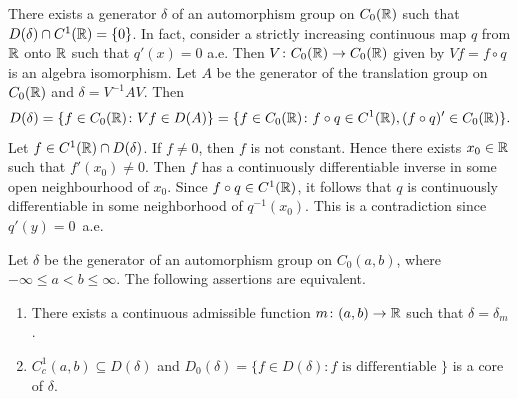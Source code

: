 \begin{example}\label{ex:b2-3.22}
%
There exists a generator $\delta$ of an automorphism group on $C_{0}(\mathbb{R})$ such that $D(\delta) \cap C^{1}(\mathbb{R}) = \{0\}$.
In fact, consider a strictly increasing continuous map $q$ from $\mathbb{R}$ onto $\mathbb{R}$ such that
$q'(x) = 0$ a.e.
Then $V \colon C_{0}(\mathbb{R}) \to C_{0}(\mathbb{R})$ given by $Vf = f \circ q$ is an algebra isomorphism.
Let $A$ be the generator of the translation group on $C_{0}(\mathbb{R})$ and $\delta = V^{-1}AV$.
Then 
\[
D(\delta) = \{ f \in C_{0}(\mathbb{R}) \colon Vf \in D(A)\} = \{f \in C_{0}(\mathbb{R}) \colon f \circ q \in C^{1}(\mathbb{R}), (f \circ q)' \in C_{0}(\mathbb{R}) \}.
\]
Let $f \in C^{1}(\mathbb{R}) \cap D(\delta)$.
If\/ $f \neq 0$, then $f$ is not constant.
Hence there exists $x_{0} \in \mathbb{R}$ such that $f'(x_{0}) \neq 0$.
Then $f$ has a continuously differentiable inverse in some open neighbourhood of\/ $x_{0}$.
Since $f \circ q \in C^{1}(\mathbb{R})$, it follows that $q$ is continuously differentiable in some neighborhood of\/ $q^{-1}(x_{0})$.
This is a contradiction since $q'(y) = 0$~a.e.
\end{example}
\begin{theorem}\label{thm:b2-3.23}
%
Let $\delta$ be the generator of an automorphism group on $C_{0}(a,b)$, where $-\infty \leq a < b \leq \infty$.
The following assertions are equivalent.
\begin{enumerate}[\upshape (a)]
\item \label{thm:b2-3.23-1} 
There exists a continuous admissible function $m \colon (a,b) \to \mathbb{R}$ such that $\delta = \delta_{m}$.
\item \label{thm:b2-3.23-2}
$C_{c}^{1}(a,b) \subseteq D(\delta)$ and $D_{0}(\delta) = \{ f \in D(\delta) \colon f \text{ is differentiable } \}$ is a core of\/ $\delta$.
\end{enumerate}
\end{theorem}
